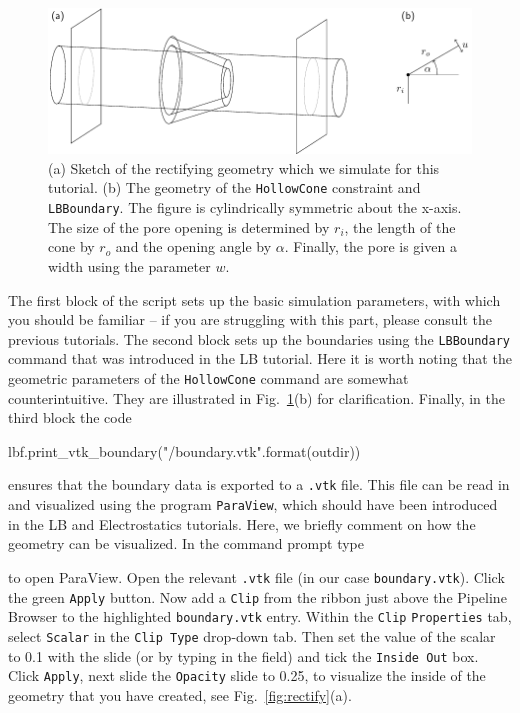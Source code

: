 \documentclass[aip,jcp,reprint,a4paper,onecolumn,amsmath]{revtex4-1}
\newcommand\code{\lstinline}
\newcommand\codees{\lstinline[language=python]}
\begin{document}
\begin{figure}[!htb]
\begin{center}
\includegraphics[scale=1.0]{FIGURES/geometry}
\end{center}
\caption{\label{fig:system}(a) Sketch of the rectifying geometry which we simulate for this tutorial. (b) The geometry of the \codees{HollowCone} constraint and \codees{LBBoundary}. The figure is cylindrically symmetric about the x-axis. The size of the pore opening is determined by $r_{i}$, the length of the cone by $r_{o}$ and the opening angle by $\alpha$. Finally, the pore is given a width using the parameter $w$.}
\end{figure}

The first block of the script sets up the basic simulation parameters, with which you should be familiar -- if you are struggling with this part, please consult the previous tutorials. The second block sets up the boundaries using the \codees{LBBoundary} command that was introduced in the LB tutorial. Here it is worth noting that the geometric parameters of the \codees{HollowCone} command are somewhat counterintuitive. They are illustrated in Fig.~\ref{fig:system}(b) for clarification. Finally, in the third block the code
\begin{espresso}
lbf.print_vtk_boundary("{}/boundary.vtk".format(outdir))
\end{espresso}
ensures that the boundary data is exported to a \codees{.vtk} file. This file can be read in and visualized using the program \code{ParaView}, which should have been introduced in the LB and Electrostatics tutorials. Here, we briefly comment on how the geometry can be visualized. In the command prompt type
to open ParaView. Open the relevant \code{.vtk} file (in our case \code{boundary.vtk}). Click the green \code{Apply} button. Now add a \code{Clip} from the ribbon just above the Pipeline Browser to the highlighted \code{boundary.vtk} entry. Within the \code{Clip} \code{Properties} tab, select \code{Scalar} in the \code{Clip Type} drop-down tab. Then set the value of the scalar to 0.1 with the slide (or by typing in the field) and tick the \code{Inside Out} box. Click \code{Apply}, next slide the \code{Opacity} slide to 0.25, to visualize the inside of the geometry that you have created, see Fig.~\ref{fig:rectify}(a).
\end{document}
